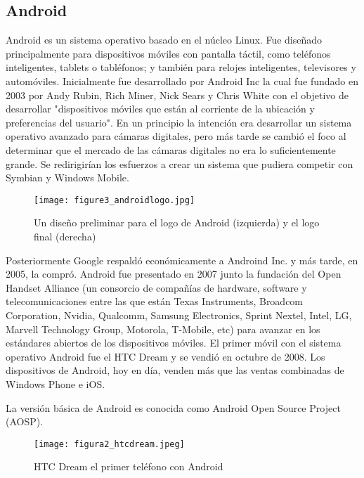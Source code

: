 \subsection{Android}
			\par
				Android es un sistema operativo basado en el núcleo Linux. Fue diseñado principalmente para dispositivos móviles con pantalla táctil, como teléfonos inteligentes, tablets o tabléfonos; y también para relojes inteligentes, televisores y automóviles. Inicialmente fue desarrollado por Android Inc la cual fue fundado en 2003 por Andy Rubin, Rich Miner, Nick Sears y Chris White con el objetivo de desarrollar "dispositivos móviles que están al corriente de la ubicación y preferencias del usuario". En un principio la intención era desarrollar un sistema operativo avanzado para cámaras digitales, pero más tarde se cambió el foco al determinar que el mercado de las cámaras digitales no era lo suficientemente grande. Se redirigirían los esfuerzos a crear un sistema que pudiera competir con Symbian y Windows Mobile.
				
				\begin{figure}[h]
					\centering
					\texttt{[image: figure3\_androidlogo.jpg]}
					\caption{Un diseño preliminar para el logo de Android (izquierda) y el logo final (derecha)}
				\end{figure}
			
			\par \noindent
				 Posteriormente Google respaldó económicamente a Androind Inc. y más tarde, en 2005, la compró. Android fue presentado en 2007 junto la fundación del Open Handset Alliance (un consorcio de compañías de hardware, software y telecomunicaciones entre las que están Texas Instruments, Broadcom Corporation, Nvidia, Qualcomm, Samsung Electronics, Sprint Nextel, Intel, LG, Marvell Technology Group, Motorola, T-Mobile, etc) para avanzar en los estándares abiertos de los dispositivos móviles. El primer móvil con el sistema operativo Android fue el HTC Dream y se vendió en octubre de 2008. Los dispositivos de Android, hoy en día, venden más que las ventas combinadas de Windows Phone e iOS.
			
			\par \noindent
				La versión básica de Android es conocida como Android Open Source Project (AOSP).
			
			\begin{figure}[h]
				\centering
				\texttt{[image: figura2\_htcdream.jpeg]}
				\caption{HTC Dream el primer teléfono con Android}
			\end{figure}
		
